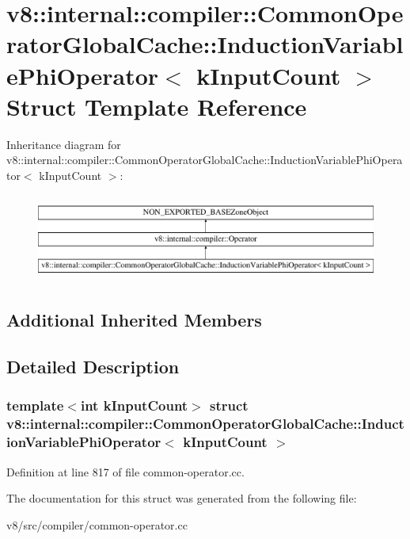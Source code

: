 \hypertarget{structv8_1_1internal_1_1compiler_1_1CommonOperatorGlobalCache_1_1InductionVariablePhiOperator}{}\section{v8\+:\+:internal\+:\+:compiler\+:\+:Common\+Operator\+Global\+Cache\+:\+:Induction\+Variable\+Phi\+Operator$<$ k\+Input\+Count $>$ Struct Template Reference}
\label{structv8_1_1internal_1_1compiler_1_1CommonOperatorGlobalCache_1_1InductionVariablePhiOperator}
Inheritance diagram for v8\+:\+:internal\+:\+:compiler\+:\+:Common\+Operator\+Global\+Cache\+:\+:Induction\+Variable\+Phi\+Operator$<$ k\+Input\+Count $>$\+:\begin{figure}[H]
\begin{center}
\leavevmode
\includegraphics[height=2.906574cm]{structv8_1_1internal_1_1compiler_1_1CommonOperatorGlobalCache_1_1InductionVariablePhiOperator}
\end{center}
\end{figure}
\subsection*{Additional Inherited Members}


\subsection{Detailed Description}
\subsubsection*{template$<$int k\+Input\+Count$>$\newline
struct v8\+::internal\+::compiler\+::\+Common\+Operator\+Global\+Cache\+::\+Induction\+Variable\+Phi\+Operator$<$ k\+Input\+Count $>$}



Definition at line 817 of file common-\/operator.\+cc.



The documentation for this struct was generated from the following file\+:\begin{DoxyCompactItemize}
\item 
v8/src/compiler/common-\/operator.\+cc\end{DoxyCompactItemize}
